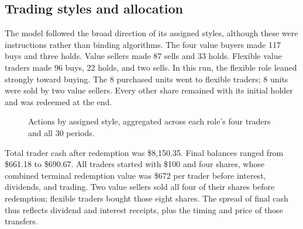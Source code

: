 \documentclass[11pt]{article}
\begin{document}
\subsection{Trading styles and allocation}
The model followed the broad direction of its assigned styles, although these
were instructions rather than binding algorithms. The four value buyers made
117 buys and three holds. Value sellers made 87 sells and 33 holds. Flexible
value traders made 96 buys, 22 holds, and two sells. In this run, the flexible
role leaned strongly toward buying. The 8 purchased units went to flexible
traders; 8 units were sold by two value sellers. Every other share remained
with its initial holder and was redeemed at the end.

\begin{figure}[H]
\centering
{}
\caption{Actions by assigned style, aggregated across each role's four traders
and all 30 periods.}
\end{figure}

Total trader cash after redemption was \$8,150.35. Final balances ranged from
\$661.18 to \$690.67. All traders started with \$100 and four shares, whose
combined terminal redemption value was \$672 per trader before interest,
dividends, and trading. Two value sellers sold all four of their shares before
redemption; flexible traders bought those eight shares. The spread of final
cash thus reflects dividend and interest receipts, plus the timing and price
of those transfers.
\end{document}
